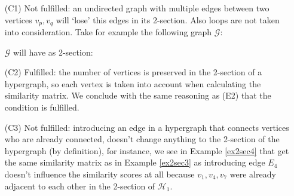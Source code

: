 \documentclass[a4paper,11pt]{report}
\newcommand{\graf}{\mathscr{G}}
\newcommand{\hgrafeen}{\mathcal{H}}
\begin{document}
\begin{itemize}
  \item[(C1)] Not fulfilled: an undirected graph with multiple edges between two vertices $v_p, v_q$ will `lose' this
  edges in its 2-section. Also loops are not taken into consideration. Take for example the following graph $\graf$:
   \begin{center}

\end{center} 
$\graf$ will have as 2-section:
 \begin{center}

\end{center}
  \item[(C2)] Fulfilled: the number of vertices is preserved in the 2-section of 
  a hypergraph, so each vertex is taken into account when calculating the 
  similarity matrix. We conclude with the same reasoning as (E2) that the 
  condition is fulfilled.
  \item[(C3)] Not fulfilled: introducing an edge in a hypergraph that connects vertices who are already connected, 
doesn't change anything to the 2-section of the hypergraph (by definition), for 
instance, we see in Example \ref{ex2sec4} that get the same similarity matrix as in Example \ref{ex2sec3} as introducing edge 
$E_4$ doesn't influence the similarity scores at all 
because $v_1, v_4, v_7$ were already adjacent to each other in the 2-section of 
$\hgrafeen_1$. 


\end{itemize}
\end{document}
